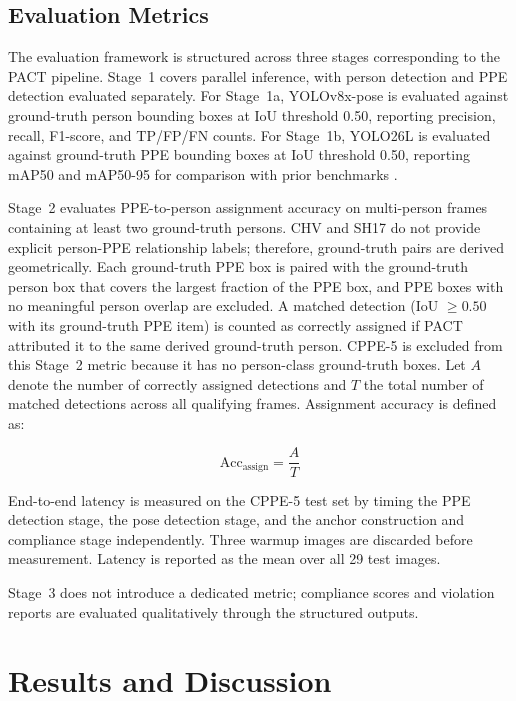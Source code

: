 \documentclass[conference,a4paper]{IEEEtran}
\begin{document}
\subsection{Evaluation Metrics}
The evaluation framework is structured across three stages corresponding to the PACT pipeline. Stage~1 covers parallel inference, with person detection and PPE detection evaluated separately. For Stage~1a, YOLOv8x-pose is evaluated against ground-truth person bounding boxes at IoU threshold 0.50, reporting precision, recall, F1-score, and TP/FP/FN counts. For Stage~1b, YOLO26L is evaluated against ground-truth PPE bounding boxes at IoU threshold 0.50, reporting mAP50 and mAP50-95 for comparison with prior benchmarks \cite{ref5,ref1,ref2}.

Stage~2 evaluates PPE-to-person assignment accuracy on multi-person frames containing at least two ground-truth persons. CHV and SH17 do not provide explicit person-PPE relationship labels; therefore, ground-truth pairs are derived geometrically. Each ground-truth PPE box is paired with the ground-truth person box that covers the largest fraction of the PPE box, and PPE boxes with no meaningful person overlap are excluded. A matched detection (IoU $\geq 0.50$ with its ground-truth PPE item) is counted as correctly assigned if PACT attributed it to the same derived ground-truth person. CPPE-5 is excluded from this Stage~2 metric because it has no person-class ground-truth boxes. Let $A$ denote the number of correctly assigned detections and $T$ the total number of matched detections across all qualifying frames. Assignment accuracy is defined as:

\begin{equation}
    \text{Acc}_{\text{assign}} = \frac{A}{T}
    \label{eq:assign_acc}
\end{equation}

End-to-end latency is measured on the CPPE-5 test set by timing the PPE detection stage, the pose detection stage, and the anchor construction and compliance stage independently. Three warmup images are discarded before measurement. Latency is reported as the mean over all 29 test images.

Stage~3 does not introduce a dedicated metric; compliance scores and violation reports are evaluated qualitatively through the structured outputs.

\FloatBarrier


\section{Results and Discussion}
\FloatBarrier
\end{document}
